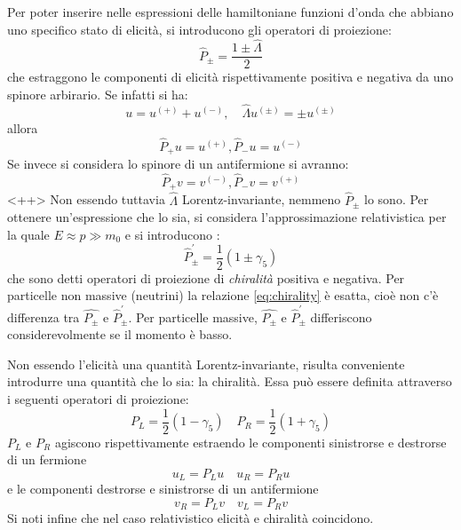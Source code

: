 \documentclass{subnucbo}
\begin{document}
Per poter inserire nelle espressioni delle hamiltoniane funzioni d'onda che abbiano uno specifico stato di elicità, si introducono gli operatori di proiezione:
\begin{equation}
        \hat { P } _ { \pm } = \frac { 1 \pm \hat { \Lambda } } { 2 }
        \label{eq:projection_operators}
\end{equation}
che estraggono le componenti di elicità rispettivamente positiva e negativa da uno spinore arbirario. Se infatti si ha:
\begin{equation}
        u = u ^ { ( + ) } + u ^ { ( - ) } , \quad \hat { \Lambda } u ^ { ( \pm ) } = \pm u ^ { ( \pm ) }
\end{equation}
allora
\begin{equation}
        \hat { P } _ { + } u = u ^ { ( + ) } , \hat { P } _ { - } u = u ^ { ( - ) }
\end{equation}
Se invece si considera lo spinore di un antifermione si avranno:
\begin{equation}
        \hat { P } _ { + } v = v ^ { ( - ) } , \hat { P } _ { - } v = v ^ { ( + ) }
        \label{<+label+>}
\end{equation}<++>
Non essendo tuttavia $\hat{\Lambda}$ Lorentz-invariante, nemmeno $\hat{P}_{\pm}$ lo sono. Per ottenere un'espressione che lo sia, si considera l'approssimazione relativistica per la quale $E \approx p \gg m _ { 0 }$ e si introducono \cite{ref:greiner}:
\begin{equation}
        \hat { P } _ { \pm } ^ { \prime } = \frac { 1 } { 2 } \left( 1 \pm \gamma _ { 5 } \right)
        \label{eq:chirality}
\end{equation}
che sono detti operatori di proiezione di \textit{chiralità} positiva e negativa. Per particelle non massive (neutrini) la relazione \ref{eq:chirality} è esatta, cioè non c'è differenza tra $\hat{P_{\pm}}$ e $\hat { P } _ { \pm } ^ { \prime }$. Per particelle massive, $\hat{P_{\pm}}$ e $\hat { P } _ { \pm } ^ { \prime }$ differiscono considerevolmente se il momento è basso.


Non essendo l'elicità una quantità Lorentz-invariante, risulta conveniente introdurre una quantità che lo sia: la chiralità. Essa può essere definita attraverso i seguenti operatori di proiezione:
\begin{equation}
        P _ { L } = \frac { 1 } { 2 } \left( 1 - \gamma _ { 5 } \right) \quad P _ { R } = \frac { 1 } { 2 } \left( 1 + \gamma _ { 5 } \right)
        \label{eq:plpr}
\end{equation}
$P_{L}$ e $P_{R}$ agiscono rispettivamente estraendo le componenti sinistrorse e destrorse di un fermione
\begin{equation}
        u _ { L } = P _ { L } u \quad u _ { R } = P _ { R } u
\end{equation}
e le componenti destrorse e sinistrorse di un antifermione
\begin{equation}
        v _ { R } = P _ { L } v \quad v _ { L } = P _ { R } v
\end{equation}
Si noti infine che nel caso relativistico elicità e chiralità coincidono.
\end{document}
